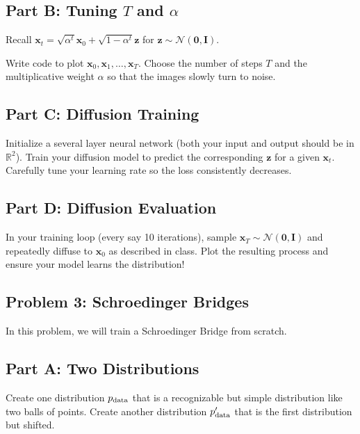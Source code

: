\documentclass{article}
\begin{document}
\subsection*{Part B: Tuning $T$ and $\alpha$}

Recall $\mathbf{x}_t = \sqrt{\alpha^t} \mathbf{x}_0 + \sqrt{1- \alpha^t} \mathbf{z}$ for $\mathbf{z} \sim \mathcal{N}(\mathbf{0}, \mathbf{I})$.

Write code to plot $\mathbf{x}_0, \mathbf{x}_1, \ldots, \mathbf{x}_T$. Choose the number of steps $T$ and the multiplicative weight $\alpha$ so that the images slowly turn to noise.

\subsection*{Part C: Diffusion Training}

Initialize a several layer neural network (both your input and output should be in $\mathbb{R}^2$).
Train your diffusion model to predict the corresponding $\mathbf{z}$ for a given $\mathbf{x}_t$.
Carefully tune your learning rate so the loss consistently decreases.

\subsection*{Part D: Diffusion Evaluation}

In your training loop (every say 10 iterations), sample $\mathbf{x}_T \sim \mathcal{N}(\mathbf{0}, \mathbf{I})$ and repeatedly diffuse to $\mathbf{x}_0$ as described in class. Plot the resulting process and ensure your model learns the distribution!

%

\newpage

\subsection*{Problem 3: Schroedinger Bridges}

In this problem, we will train a Schroedinger Bridge from scratch.

\subsection*{Part A: Two Distributions}

Create one distribution $p_{\textnormal{data}}$ that is a recognizable but simple distribution like two balls of points.
Create another distribution $p_{\textnormal{data}}'$ that is the first distribution but shifted.
\end{document}
